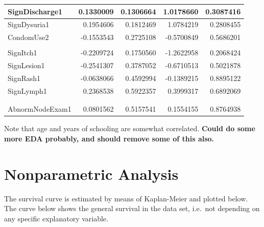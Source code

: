 \documentclass[
]{article}
\begin{document}
\begin{table}
\begin{tabular}[t]{l|r|r|r|r}
\hline
SignDischarge1 & 0.1330009 & 0.1306664 & 1.0178660 & 0.3087416\\
\hline
SignDysuria1 & 0.1954606 & 0.1812469 & 1.0784219 & 0.2808455\\
\hline
CondomUse2 & -0.1553543 & 0.2725108 & -0.5700849 & 0.5686201\\
\hline
\cellcolor{cyan}{\textcolor{white}{CondomUse3}} & \cellcolor{cyan}{\textcolor{white}{-0.4582270}} & \cellcolor{cyan}{\textcolor{white}{0.2819913}} & \cellcolor{cyan}{\textcolor{white}{-1.6249684}} & \cellcolor{cyan}{\textcolor{white}{0.1041693}}\\
\hline
SignItch1 & -0.2209724 & 0.1750560 & -1.2622958 & 0.2068424\\
\hline
SignLesion1 & -0.2541307 & 0.3787052 & -0.6710513 & 0.5021878\\
\hline
SignRash1 & -0.0638066 & 0.4592994 & -0.1389215 & 0.8895122\\
\hline
SignLymph1 & 0.2368538 & 0.5922357 & 0.3999317 & 0.6892069\\
\hline
\cellcolor{cyan}{\textcolor{white}{InvVagAtExam1}} & \cellcolor{cyan}{\textcolor{white}{0.5726933}} & \cellcolor{cyan}{\textcolor{white}{0.2003764}} & \cellcolor{cyan}{\textcolor{white}{2.8580874}} & \cellcolor{cyan}{\textcolor{white}{0.0042620}}\\
\hline
\cellcolor{cyan}{\textcolor{white}{DischargeExam1}} & \cellcolor{cyan}{\textcolor{white}{-0.5805191}} & \cellcolor{cyan}{\textcolor{white}{0.2691414}} & \cellcolor{cyan}{\textcolor{white}{-2.1569301}} & \cellcolor{cyan}{\textcolor{white}{0.0310111}}\\
\hline
AbnormNodeExam1 & 0.0801562 & 0.5157541 & 0.1554155 & 0.8764938\\
\hline
\end{tabular}
\end{table}

Note that age and years of schooling are somewhat correlated. \textbf{Could do some more EDA probably, and should remove some of this also.}

\hypertarget{nonparametric-analysis}{%
\section{Nonparametric Analysis}\label{nonparametric-analysis}}

The survival curve is estimated by means of Kaplan-Meier and plotted below. The curve below shows the general survival in the data set, i.e.~not depending on any specific explanatory variable.
\end{document}
